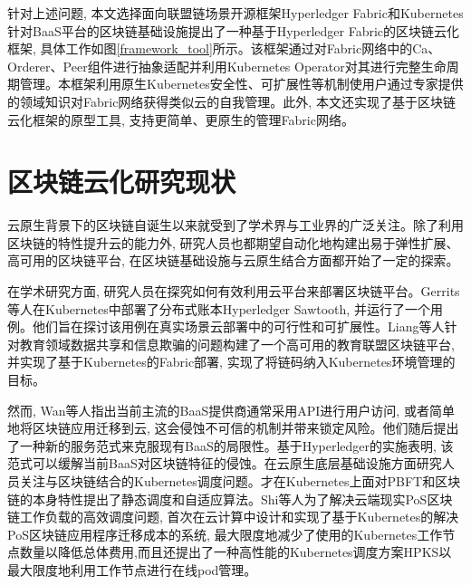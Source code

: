 针对上述问题, 本文选择面向联盟链场景开源框架Hyperledger Fabric和Kubernetes针对BaaS平台的区块链基础设施提出了一种基于Hyperledger Fabric的区块链云化框架, 具体工作如图\ref{framework_tool}所示。该框架通过对Fabric网络中的Ca、Orderer、Peer组件进行抽象适配并利用Kubernetes Operator对其进行完整生命周期管理。本框架利用原生Kubernetes安全性、可扩展性等机制使用户通过专家提供的领域知识对Fabric网络获得类似云的自我管理。此外, 本文还实现了基于区块链云化框架的原型工具, 支持更简单、更原生的管理Fabric网络。

\section{区块链云化研究现状}

云原生背景下的区块链自诞生以来就受到了学术界与工业界的广泛关注。除了利用区块链的特性提升云的能力外\cite{DBLP:journals/comcom/XieZZWH21}\cite{DBLP:conf/smartcloud/SunWY20}\cite{8457813}, 研究人员也都期望自动化地构建出易于弹性扩展、高可用的区块链平台, 在区块链基础设施与云原生结合方面都开始了一定的探索。

在学术研究方面, 研究人员在探究如何有效利用云平台来部署区块链平台。Gerrits等人\cite{DBLP:conf/coins/GerritsKKFV21}在Kubernetes中部署了分布式账本Hyperledger Sawtooth\footnotemark[1], 并运行了一个用例。他们旨在探讨该用例在真实场景云部署中的可行性和可扩展性。Liang等人\cite{liangeduchain}针对教育领域数据共享和信息欺骗的问题构建了一个高可用的教育联盟区块链平台, 并实现了基于Kubernetes的Fabric部署, 实现了将链码纳入Kubernetes环境管理的目标。

然而, Wan等人\cite{wan2018novel}指出当前主流的BaaS提供商通常采用API进行用户访问, 或者简单地将区块链应用迁移到云, 这会侵蚀不可信的机制并带来锁定风险。他们随后提出了一种新的服务范式来克服现有BaaS的局限性。基于Hyperledger的实施表明, 该范式可以缓解当前BaaS对区块链特征的侵蚀。在云原生底层基础设施方面研究人员关注与区块链结合的Kubernetes调度问题。才\cite{caili2018}在Kubernetes上面对PBFT和区块链的本身特性提出了静态调度和自适应算法。Shi等人\cite{9582270}为了解决云端现实PoS区块链工作负载的高效调度问题, 首次在云计算中设计和实现了基于Kubernetes的解决PoS区块链应用程序迁移成本的系统, 最大限度地减少了使用的Kubernetes工作节点数量以降低总体费用,而且还提出了一种高性能的Kubernetes调度方案HPKS以最大限度地利用工作节点进行在线pod管理。

